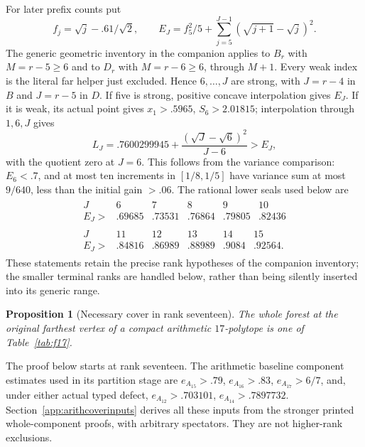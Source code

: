 \documentclass[11pt]{article}
\newtheorem{proposition}[theorem]{Proposition}
\begin{document}
For later prefix counts put
\[
 f_j=\sqrt j-.61/\sqrt2,\qquad
 E_J=f_5^2/5+\sum_{j=5}^{J-1}(\sqrt{j+1}-\sqrt j)^2.
\]
The generic geometric inventory in the companion applies to $B_r$
with $M=r-5\ge6$ and to $D_r$ with $M=r-6\ge6$, through
$M+1$. Every weak index is the literal far helper just excluded.
Hence $6,\ldots,J$ are strong, with $J=r-4$ in $B$ and $J=r-5$
in $D$. If five is strong, positive concave interpolation gives $E_J$.
If it is weak, its actual point gives $x_1>.5965$, $S_6>2.01815$;
interpolation through $1,6,J$ gives
\[
 L_J=.7600299945+\frac{(\sqrt J-\sqrt6)^2}{J-6}>E_J,
\]
with the quotient zero at $J=6$. This follows from the variance
comparison: $E_6<.7$, and at most ten increments in $[1/8,1/5]$
have variance sum at most $9/640$, less than the initial gain $>.06$.
The rational lower seals used below are
\begin{equation}\label{eq:prefixfloors}
\begin{gathered}
\begin{array}{c|rrrrr}
J&6&7&8&9&10\\\hline
E_J>&.69685&.73531&.76864&.79805&.82436
\end{array}\\[4pt]
\begin{array}{c|rrrrr}
J&11&12&13&14&15\\\hline
E_J>&.84816&.86989&.88989&.9084&.92564.
\end{array}
\end{gathered}
\end{equation}
These statements retain the precise rank hypotheses of the companion
inventory; the smaller terminal ranks are handled below, rather than
being silently inserted into its generic range.

\begin{proposition}[Necessary cover in rank seventeen]\label{prop:f17}
The whole forest at the original farthest vertex of a compact
arithmetic $17$-polytope is one of Table~\ref{tab:f17}.
\end{proposition}
The proof below starts at rank seventeen. The arithmetic baseline
component estimates used in its partition stage are $e_{A_{15}}>.79$,
$e_{A_{16}}>.83$, $e_{A_{17}}>6/7$, and, under either actual typed
defect, $e_{A_{12}}>.703101$, $e_{A_{14}}>.7897732$.
Section~\ref{app:arithcoverinputs} derives all these inputs from the
stronger printed whole-component proofs, with arbitrary spectators.
They are not higher-rank exclusions.
\end{document}
